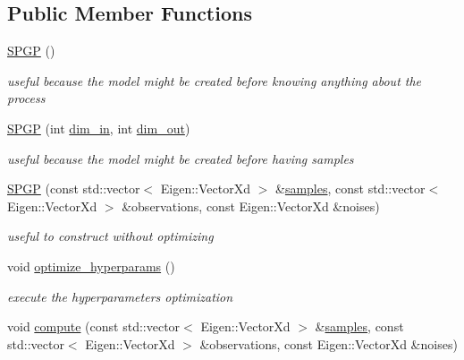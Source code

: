 \subsection*{Public Member Functions}
\begin{DoxyCompactItemize}
\item 
\hyperlink{classlimbo_1_1model_1_1_s_p_g_p_a7052cad1d905c48e673f2a843d2643c9}{S\+P\+G\+P} ()
\begin{DoxyCompactList}\small\item\em useful because the model might be created before knowing anything about the process \end{DoxyCompactList}\item 
\hyperlink{classlimbo_1_1model_1_1_s_p_g_p_a6fe55238f690cfba7dc1de3e6ad25ac3}{S\+P\+G\+P} (int \hyperlink{classlimbo_1_1model_1_1_s_p_g_p_ab84d7663a814757766c2d630e0bacd9e}{dim\+\_\+in}, int \hyperlink{classlimbo_1_1model_1_1_s_p_g_p_a605b47cf6ecf50c2436cbad531099d16}{dim\+\_\+out})
\begin{DoxyCompactList}\small\item\em useful because the model might be created before having samples \end{DoxyCompactList}\item 
\hyperlink{classlimbo_1_1model_1_1_s_p_g_p_ada07822c26ef5b1f954af3650b5b3a93}{S\+P\+G\+P} (const std\+::vector$<$ Eigen\+::\+Vector\+Xd $>$ \&\hyperlink{classlimbo_1_1model_1_1_s_p_g_p_a867505eb41e8fe971eb7de28b2cea50f}{samples}, const std\+::vector$<$ Eigen\+::\+Vector\+Xd $>$ \&observations, const Eigen\+::\+Vector\+Xd \&noises)
\begin{DoxyCompactList}\small\item\em useful to construct without optimizing \end{DoxyCompactList}\item 
void \hyperlink{classlimbo_1_1model_1_1_s_p_g_p_a942a3f77cffebf2210203da69d2329d4}{optimize\+\_\+hyperparams} ()
\begin{DoxyCompactList}\small\item\em execute the hyperparameters optimization \end{DoxyCompactList}\item 
void \hyperlink{classlimbo_1_1model_1_1_s_p_g_p_ae947bef5bb27d3cc10bc4206cf552b45}{compute} (const std\+::vector$<$ Eigen\+::\+Vector\+Xd $>$ \&\hyperlink{classlimbo_1_1model_1_1_s_p_g_p_a867505eb41e8fe971eb7de28b2cea50f}{samples}, const std\+::vector$<$ Eigen\+::\+Vector\+Xd $>$ \&observations, const Eigen\+::\+Vector\+Xd \&noises)

\end{DoxyCompactItemize}
